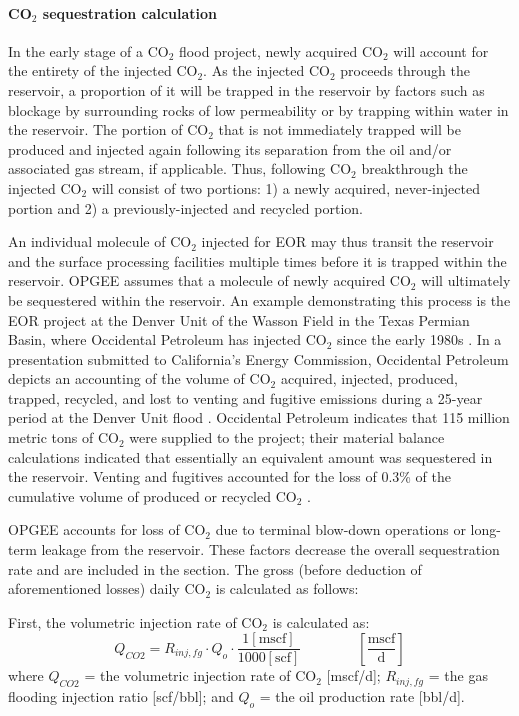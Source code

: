 \documentclass[11pt]{report}
\newcommand{\eqnunitfrac}[2]{\quad\quad \scriptstyle{\left[\frac{\text{#1}}{\text{#2}}\right]}}
\begin{document}
\paragraph{CO$_2$ sequestration calculation} \label{par:IntroSeq}
In the early stage of a CO$_2$ flood project, newly acquired CO$_2$ will account for the entirety of the injected CO$_2$. As the injected CO$_2$ proceeds through the reservoir, a proportion of it will be trapped in the reservoir by factors such as blockage by surrounding rocks of low permeability or by trapping within water in the reservoir. The portion of CO$_2$ that is not immediately trapped will be produced and injected again following its separation from the oil and/or associated gas stream, if applicable. Thus, following CO$_2$ breakthrough the injected CO$_2$ will consist of two portions: 1) a newly acquired, never-injected portion and 2) a previously-injected and recycled portion. 


An individual molecule of CO$_2$ injected for EOR may thus transit the reservoir and the surface processing facilities multiple times before it is trapped within the reservoir. OPGEE assumes that a molecule of newly acquired CO$_2$ will ultimately be sequestered within the reservoir. An example demonstrating this process is the EOR project at the Denver Unit of the Wasson Field in the Texas Permian Basin, where Occidental Petroleum has injected CO$_2$ since the early 1980s \cite{Oxy2015}. In a presentation submitted to California's Energy Commission, Occidental Petroleum depicts an accounting of the volume of CO$_2$ acquired, injected, produced, trapped, recycled, and lost to venting and fugitive emissions during a 25-year period at the Denver Unit flood \cite{Oxy2012}. Occidental Petroleum indicates that 115 million metric tons of CO$_2$ were supplied to the project; their material balance calculations indicated that essentially an equivalent amount was sequestered in the reservoir. Venting and fugitives accounted for the loss of 0.3\% of the cumulative volume of produced or recycled CO$_2$ \cite{Oxy2012}. 

OPGEE accounts for loss of CO$_2$ due to terminal blow-down operations or long-term leakage from the reservoir. These factors decrease the overall sequestration rate and are included in the  section. The gross (before deduction of aforementioned losses) daily CO$_2$ is calculated as follows:

First, the volumetric injection rate of CO$_2$ is calculated as: 
\begin{equation} \label{eq:VolumetricFloodGasInjectionRate}
Q_{CO2} = R_{inj,fg} \cdot Q_{o} \cdot \frac{1 [\text{mscf}]}{1000 [\text{scf}]} \quad\quad\eqnunitfrac{mscf}{d}
\end{equation}
where $Q_{CO2}$ = the volumetric injection rate of CO$_2$ [mscf/d]; $R_{inj,fg}$ = the gas flooding injection ratio [scf/bbl]; and $Q_{o}$ = the oil production rate [bbl/d].
\end{document}
